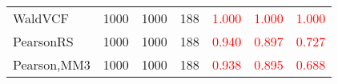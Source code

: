 \documentclass[
]{article}
\begin{document}
\begin{table}[H]
{\begin{tabular}[t]{lrrrrrr}
\hspace{1em}WaldVCF & 1000 & 1000 & 188 & \textcolor{red}{1.000} & \textcolor{red}{1.000} & \textcolor{red}{1.000}\\
\hspace{1em}PearsonRS & 1000 & 1000 & 188 & \textcolor{red}{0.940} & \textcolor{red}{0.897} & \textcolor{red}{0.727}\\
\hspace{1em}Pearson,MM3 & 1000 & 1000 & 188 & \textcolor{red}{0.938} & \textcolor{red}{0.895} & \textcolor{red}{0.688}\\
\bottomrule
\end{tabular}}
\endgroup{}
\end{table}
\end{document}
